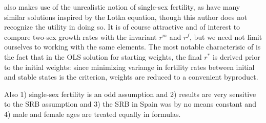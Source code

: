 \citet{mitra1978derivation} also makes use of the unrealistic
notion of single-sex fertility, as have many similar solutions inspired by the
Lotka equation, though this author does not recognize the utility in doing so.
It is of course attractive and of interest to compare two-sex growth rates with the invariant $r^m$ and $r^f$, but
we need not limit ourselves to working with the same elements. The most notable characterisic of
\citep{mitra1978derivation} is the fact that in the OLS solution for starting
weights, the final $r^\ast$ is derived prior to the initial weights: since
minimizing variange in fertility rates between initial and stable states is the
criterion, weights are reduced to a convenient byproduct.

Also 1) single-sex fertility is an odd assumption and 2) results are very
sensitive to the SRB assumption and 3) the SRB in Spain was by no means constant
and 4) male and female ages are treated equally in formulas.





